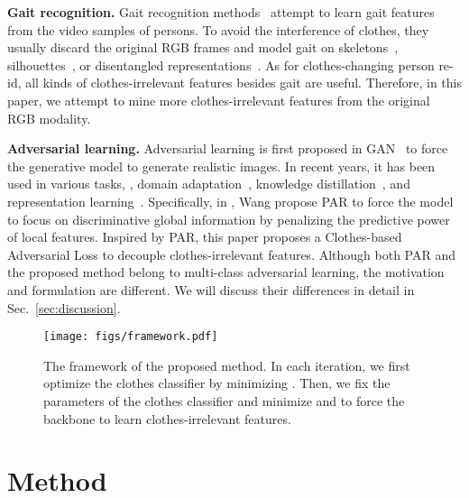 \documentclass[10pt,twocolumn,letterpaper]{article}
\begin{document}
\medskip
\noindent
{\bf Gait recognition.}
Gait recognition methods~\cite{Zhang2019Gait,Chao2019Gaitset} attempt to learn gait features from the video samples of persons.
To avoid the interference of clothes, they usually discard the original RGB frames and model gait on skeletons~\cite{Yang2016Learning, Ariyanto2012Marionette}, silhouettes~\cite{Chao2019Gaitset, Han2006Individual}, or disentangled representations~\cite{Zhang2019Gait}.
As for clothes-changing person re-id, all kinds of clothes-irrelevant features besides gait are useful.
Therefore, in this paper, we attempt to mine more clothes-irrelevant features from the original RGB modality.

\medskip
\noindent
{\bf Adversarial learning.}
Adversarial learning is first proposed in GAN~\cite{Goodfellow2014GAN} to force the generative model to generate realistic images.
In recent years, it has been used in various tasks, \eg, domain adaptation~\cite{Tzeng2017AdversarialDA,Long2018ConditionalDA}, knowledge distillation~\cite{shen2019MEAL}, and representation learning~\cite{Wang2019LearningRobust}.
Specifically, in \cite{Wang2019LearningRobust}, Wang \etal propose PAR to force the model to focus on discriminative global information by penalizing the predictive power of local features.
Inspired by PAR, this paper proposes a Clothes-based Adversarial Loss to decouple clothes-irrelevant features.
Although both PAR and the proposed method belong to multi-class adversarial learning, the motivation and formulation are different. 
We will discuss their differences in detail in Sec.~\ref{sec:discussion}.


\begin{figure}[t]
	\centering
	\texttt{[image: figs/framework.pdf]}\\
\caption{The framework of the proposed method. In each iteration, we first optimize the clothes classifier by minimizing . Then, we fix the parameters of the clothes classifier and minimize  and  to force the backbone to learn clothes-irrelevant features.}
	\vspace{-10pt}
	\label{fig:framework}
\end{figure}

\section{Method}
\end{document}
